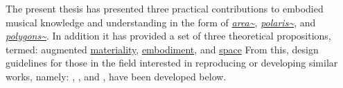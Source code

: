 The present thesis has presented three practical contributions to embodied musical knowledge and understanding in the form of \textit{\hyperref[sec: area]{area\textasciitilde{}}}, \textit{\hyperref[sec: polaris]{polaris\textasciitilde{}}}, and \textit{\hyperref[sec: polygons]{polygons\textasciitilde{}}}. In addition it has provided a set of three theoretical propositions, termed: augmented \hyperref[sec: discussion-medium-material]{materiality}, \hyperref[sec: discussion-medium-embodiment]{embodiment}, and \hyperref[sec: discussion-medium-space]{space} From this, design guidelines for those in the field interested in reproducing or developing similar works, namely: \textit{}, \textit{}, and \textit{}, have been developed below.


